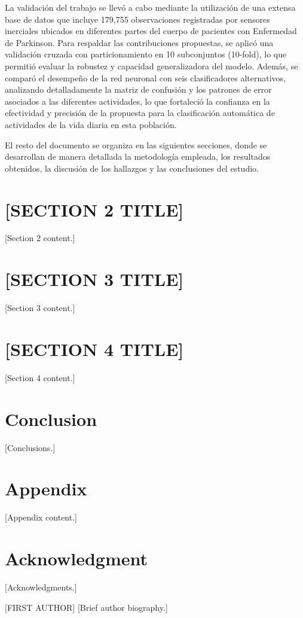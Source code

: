 \documentclass[journal]{IEEEtran}
\begin{document}
La validación del trabajo se llevó a cabo mediante la utilización de una extensa base de datos que incluye 179,755 observaciones registradas por sensores inerciales ubicados en diferentes partes del cuerpo de pacientes con Enfermedad de Parkinson. Para respaldar las contribuciones propuestas, se aplicó una validación cruzada con particionamiento en 10 subconjuntos (10-fold), lo que permitió evaluar la robustez y capacidad generalizadora del modelo. Además, se comparó el desempeño de la red neuronal con seis clasificadores alternativos, analizando detalladamente la matriz de confusión y los patrones de error asociados a las diferentes actividades, lo que fortaleció la confianza en la efectividad y precisión de la propuesta para la clasificación automática de actividades de la vida diaria en esta población.

El resto del documento se organiza en las siguientes secciones, donde se desarrollan de manera detallada la metodología empleada, los resultados obtenidos, la discusión de los hallazgos y las conclusiones del estudio.


\section{[SECTION 2 TITLE]}
\label{sec:section2}

[Section 2 content.]


\section{[SECTION 3 TITLE]}
\label{sec:section3}

[Section 3 content.]


\section{[SECTION 4 TITLE]}
\label{sec:section4}

[Section 4 content.]


\section{Conclusion}
\label{sec:conclusion}

[Conclusions.]


\appendices
\section{Appendix}
[Appendix content.]


\section*{Acknowledgment}

[Acknowledgments.]




\begin{IEEEbiographynophoto}{[FIRST AUTHOR]}
[Brief author biography.]
\end{IEEEbiographynophoto}




\end{document}
